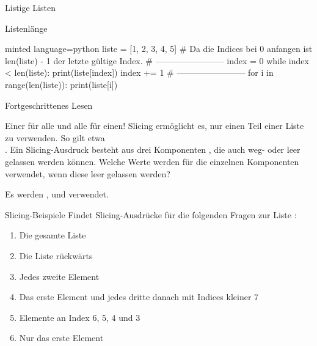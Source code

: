 \begin{task}[points=auto]{Listige Listen}
\begin{subtask*}[points=0]{Listenlänge }
        \begin{solution}
            \begin{codeBlock}[]{minted language=python}
                liste = [1, 2, 3, 4, 5]
                # Da die Indices bei 0 anfangen ist len(liste) - 1 der letzte gültige Index.
                # ------------------------
                index = 0
                while index < len(liste):
                    print(liste[index])
                    index += 1
                # ------------------------
                for i in range(len(liste)):
                    print(liste[i])
            \end{codeBlock}
        \end{solution}
    \end{subtask*}
\end{task}
\begin{task}[points=auto]{Fortgeschrittenes Lesen}
    \begin{subtask*}[points=0]{Einer für alle und alle für einen! }
        Slicing ermöglicht es, nur einen Teil einer Liste zu verwenden.
        So gilt etwa \\\pythoninline{[1,2,3,4][1:3] == [2,3]}. Ein Slicing-Ausdruck
        besteht aus drei Komponenten \pythoninline{[a:b:c]}, die auch weg- oder leer
        gelassen werden können. Welche Werte werden für die einzelnen Komponenten
        verwendet, wenn diese leer gelassen werden?

        \begin{solution}
            Es werden ,  und 
            verwendet.
        \end{solution}
    \end{subtask*}
    \begin{subtask*}[points=0]{Slicing-Beispiele }
        Findet Slicing-Ausdrücke für die folgenden Fragen zur Liste :

        \begin{enumerate}
            \item Die gesamte Liste
            \item Die Liste rückwärts
            \item Jedes zweite Element
            \item Das erste Element und jedes dritte danach mit Indices kleiner $7$
            \item Elemente an Index $6$, $5$, $4$ und $3$
            \item Nur das erste Element
        \end{enumerate}


\end{subtask*}
\end{task}

